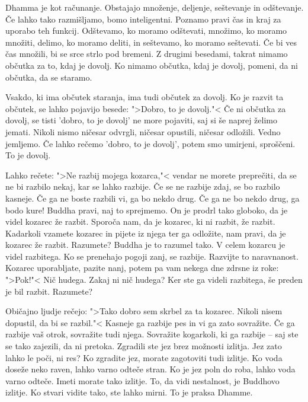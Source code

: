 \clearpage


Dhamma je kot računanje. Obstajajo množenje, deljenje, seštevanje in odštevanje. Če lahko tako razmišljamo, bomo inteligentni. Poznamo pravi čas in kraj za uporabo teh funkcij. Odštevamo, ko moramo odštevati, množimo, ko moramo množiti, delimo, ko moramo deliti, in seštevamo, ko moramo seštevati. Če bi ves čas množili, bi se srce strlo pod bremeni. Z drugimi besedami, takrat nimamo občutka za to, kdaj je dovolj. Ko nimamo občutka, kdaj je dovolj, pomeni, da ni občutka, da se staramo. 

Vsakdo, ki ima občutek staranja, ima tudi občutek za dovolj. Ko je razvit ta občutek, se lahko pojavijo besede: ">Dobro, to je dovolj."< Če ni občutka za dovolj, se tisti 'dobro, to je dovolj' ne more pojaviti, saj si še naprej želimo jemati. Nikoli nismo ničesar odvrgli, ničesar opustili, ničesar odložili. Vedno jemljemo. Če lahko rečemo 'dobro, to je dovolj', potem smo umirjeni, sproščeni. To je dovolj.

\clearpage


Lahko rečete: ">Ne razbij mojega kozarca,"< vendar ne morete preprečiti, da se ne bi razbilo nekaj, kar se lahko razbije. Če se ne razbije zdaj, se bo razbilo kasneje. Če ga ne boste razbili vi, ga bo nekdo drug. Če ga ne bo nekdo drug, ga bodo kure! Buddha pravi, naj to sprejmemo. On je prodrl tako globoko, da je videl kozarec že razbit. Sporoča nam, da je kozarec, ki ni razbit, že razbit. Kadarkoli vzamete kozarec in pijete iz njega ter ga odložite, nam pravi, da je kozarec že razbit. Razumete? Buddha je to razumel tako. V celem kozarcu je videl razbitega. Ko se prenehajo pogoji zanj, se razbije. Razvijte to naravnanost. Kozarec uporabljate, pazite nanj, potem pa vam nekega dne zdrsne iz roke: ">Pok!"< Nič hudega. Zakaj ni nič hudega? Ker ste ga videli razbitega, še preden je bil razbit. Razumete?

Običajno ljudje rečejo: ">Tako dobro sem skrbel za ta kozarec. Nikoli nisem dopustil, da bi se razbil."< Kasneje ga razbije pes in vi ga zato sovražite. Če ga razbije vaš otrok, sovražite tudi njega. Sovražite kogarkoli, ki ga razbije – saj ste se tako zajezili, da ni pretoka. Zgradili ste jez brez možnosti izlitja. Jez zato lahko le poči, ni res? Ko zgradite jez, morate zagotoviti tudi izlitje. Ko voda doseže neko raven, lahko varno odteče stran. Ko je jez poln do roba, lahko voda varno odteče. Imeti morate tako izlitje. To, da vidi nestalnost, je Buddhovo izlitje. Ko stvari vidite tako, ste lahko mirni. To je praksa Dhamme.

